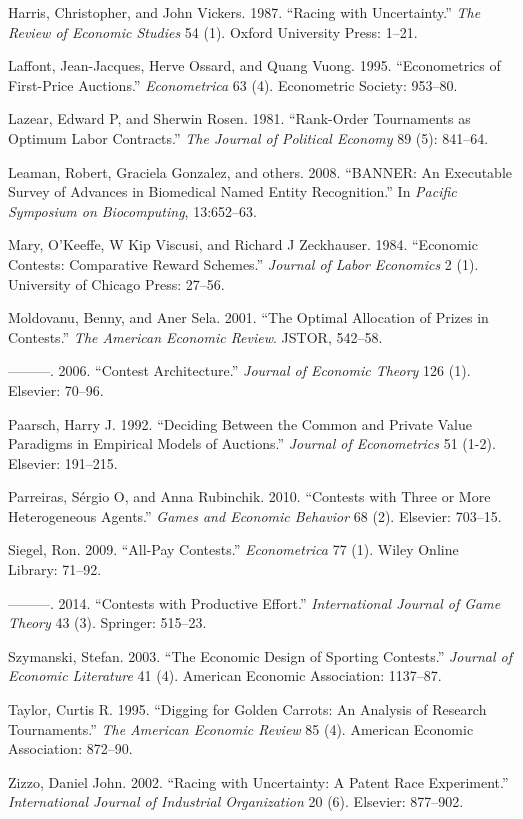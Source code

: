 \documentclass[11pt, titlepage]{article}
\begin{document}
\hypertarget{ref-harris1987racing}{}
Harris, Christopher, and John Vickers. 1987. ``Racing with
Uncertainty.'' \emph{The Review of Economic Studies} 54 (1). Oxford
University Press: 1--21.

\hypertarget{ref-laffont1995econometrics}{}
Laffont, Jean-Jacques, Herve Ossard, and Quang Vuong. 1995.
``Econometrics of First-Price Auctions.'' \emph{Econometrica} 63 (4).
Econometric Society: 953--80.

\hypertarget{ref-lazear1981rank}{}
Lazear, Edward P, and Sherwin Rosen. 1981. ``Rank-Order Tournaments as
Optimum Labor Contracts.'' \emph{The Journal of Political Economy} 89
(5): 841--64.

\hypertarget{ref-leaman2008banner}{}
Leaman, Robert, Graciela Gonzalez, and others. 2008. ``BANNER: An
Executable Survey of Advances in Biomedical Named Entity Recognition.''
In \emph{Pacific Symposium on Biocomputing}, 13:652--63.

\hypertarget{ref-mary1984economic}{}
Mary, O'Keeffe, W Kip Viscusi, and Richard J Zeckhauser. 1984.
``Economic Contests: Comparative Reward Schemes.'' \emph{Journal of
Labor Economics} 2 (1). University of Chicago Press: 27--56.

\hypertarget{ref-moldovanu2001optimal}{}
Moldovanu, Benny, and Aner Sela. 2001. ``The Optimal Allocation of
Prizes in Contests.'' \emph{The American Economic Review}. JSTOR,
542--58.

\hypertarget{ref-moldovanu2006contest}{}
---------. 2006. ``Contest Architecture.'' \emph{Journal of Economic
Theory} 126 (1). Elsevier: 70--96.

\hypertarget{ref-paarsch1992deciding}{}
Paarsch, Harry J. 1992. ``Deciding Between the Common and Private Value
Paradigms in Empirical Models of Auctions.'' \emph{Journal of
Econometrics} 51 (1-2). Elsevier: 191--215.

\hypertarget{ref-parreiras2010contests}{}
Parreiras, Sérgio O, and Anna Rubinchik. 2010. ``Contests with Three or
More Heterogeneous Agents.'' \emph{Games and Economic Behavior} 68 (2).
Elsevier: 703--15.

\hypertarget{ref-siegel2009all}{}
Siegel, Ron. 2009. ``All-Pay Contests.'' \emph{Econometrica} 77 (1).
Wiley Online Library: 71--92.

\hypertarget{ref-siegel2014contests}{}
---------. 2014. ``Contests with Productive Effort.''
\emph{International Journal of Game Theory} 43 (3). Springer: 515--23.

\hypertarget{ref-szymanski2003economic}{}
Szymanski, Stefan. 2003. ``The Economic Design of Sporting Contests.''
\emph{Journal of Economic Literature} 41 (4). American Economic
Association: 1137--87.

\hypertarget{ref-taylor1995digging}{}
Taylor, Curtis R. 1995. ``Digging for Golden Carrots: An Analysis of
Research Tournaments.'' \emph{The American Economic Review} 85 (4).
American Economic Association: 872--90.

\hypertarget{ref-zizzo2002racing}{}
Zizzo, Daniel John. 2002. ``Racing with Uncertainty: A Patent Race
Experiment.'' \emph{International Journal of Industrial Organization} 20
(6). Elsevier: 877--902.
\end{document}
